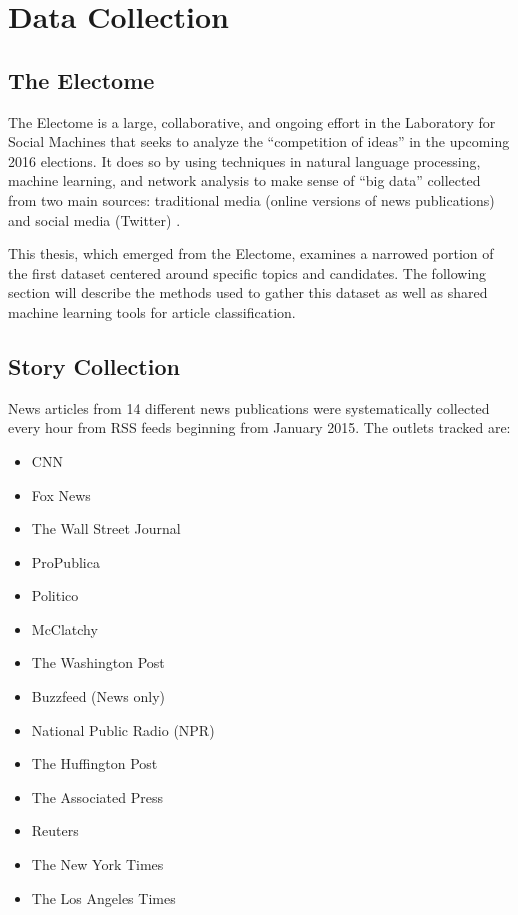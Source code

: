 \chapter{Data Collection}

\section{The Electome}

The Electome is a large, collaborative, and ongoing effort in the Laboratory for Social Machines that seeks to analyze the ``competition of ideas'' in the upcoming 2016 elections. It does so by using techniques in natural language processing, machine learning, and network analysis to make sense of ``big data'' collected from two main sources: traditional media (online versions of news publications) and social media (Twitter) \cite{vvr_electome2016}. 

This thesis, which emerged from the Electome, examines a narrowed portion of the first dataset centered around specific topics and candidates. The following section will describe the methods used to gather this dataset as well as shared machine learning tools for article classification.

\section{Story Collection} 

News articles from 14 different news publications were systematically collected every hour from RSS feeds beginning from January 2015. The outlets tracked are:

\begin{multicols}{2}
    \begin{itemize}
    \itemsep-1em 
      \item CNN
      \item Fox News
      \item The Wall Street Journal
      \item ProPublica
      \item Politico
      \item McClatchy
      \item The Washington Post
      \item Buzzfeed (News only)
      \item National Public Radio (NPR)
      \item The Huffington Post
      \item The Associated Press
      \item Reuters
      \item The New York Times
      \item The Los Angeles Times
    \end{itemize}
\end{multicols}


